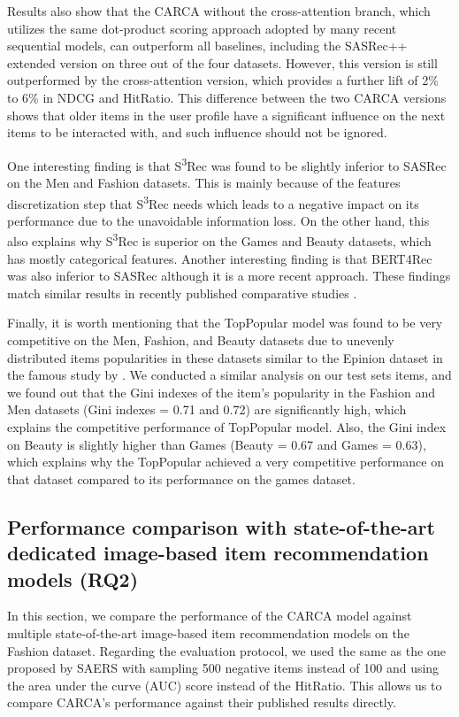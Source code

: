 \documentclass[sigconf,natbib=true]{acmart}
\begin{document}
Results also show that the CARCA without the cross-attention branch, which utilizes the same dot-product scoring approach adopted by many recent sequential models, can outperform all baselines, including the SASRec++ extended version on three out of the four datasets. However, this version is still outperformed by the cross-attention version, which provides a further lift of 2\% to 6\% in NDCG and HitRatio. This difference between the two CARCA versions shows that older items in the user profile have a significant influence on the next items to be interacted with, and such influence should not be ignored.

One interesting finding is that S\textsuperscript{3}Rec was found to be slightly inferior to SASRec on the Men and Fashion datasets. This is mainly because of the features discretization step that S\textsuperscript{3}Rec needs which leads to a negative impact on its performance due to the unavoidable information loss. On the other hand, this also explains why S\textsuperscript{3}Rec is superior on the Games and Beauty datasets, which has mostly categorical features. Another interesting finding is that BERT4Rec was also inferior to SASRec although it is a more recent approach. These findings match similar results in recently published comparative studies \cite{ZhouWZZWZWW20}.

Finally, it is worth mentioning that the TopPopular model was found to be very competitive on the Men, Fashion, and Beauty datasets due to unevenly distributed items popularities in these datasets similar to the Epinion dataset in the famous study by \cite{dacrema2019we}. We conducted a similar analysis on our test sets items, and we found out that the Gini indexes of the item's popularity in the Fashion and Men datasets (Gini indexes =  0.71 and 0.72) are significantly high, which explains the competitive performance of TopPopular model. Also, the Gini index on Beauty is slightly higher than Games (Beauty = 0.67 and Games = 0.63), which explains why the TopPopular achieved a very competitive performance on that dataset compared to its performance on the games dataset.


\subsection{Performance comparison with state-of-the-art dedicated image-based item recommendation models (RQ2)}
In this section, we compare the performance of the CARCA model against multiple state-of-the-art image-based item recommendation models on the Fashion dataset. Regarding the evaluation protocol, we used the same as the one proposed by SAERS \cite{ijcai2019650} with sampling 500 negative items instead of 100 and using the area under the curve (AUC) score instead of the HitRatio. This allows us to compare CARCA's performance against their published results directly.
\end{document}
